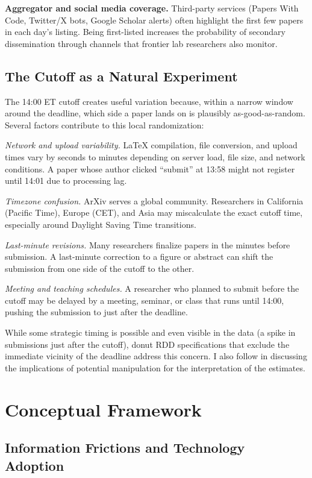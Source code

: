 \documentclass[12pt]{article}
\begin{document}
\textbf{Aggregator and social media coverage.} Third-party services (Papers With Code, Twitter/X bots, Google Scholar alerts) often highlight the first few papers in each day's listing. Being first-listed increases the probability of secondary dissemination through channels that frontier lab researchers also monitor.

\subsection{The Cutoff as a Natural Experiment}

The 14:00 ET cutoff creates useful variation because, within a narrow window around the deadline, which side a paper lands on is plausibly as-good-as-random. Several factors contribute to this local randomization:

\textit{Network and upload variability.} LaTeX compilation, file conversion, and upload times vary by seconds to minutes depending on server load, file size, and network conditions. A paper whose author clicked ``submit'' at 13:58 might not register until 14:01 due to processing lag.

\textit{Timezone confusion.} ArXiv serves a global community. Researchers in California (Pacific Time), Europe (CET), and Asia may miscalculate the exact cutoff time, especially around Daylight Saving Time transitions.

\textit{Last-minute revisions.} Many researchers finalize papers in the minutes before submission. A last-minute correction to a figure or abstract can shift the submission from one side of the cutoff to the other.

\textit{Meeting and teaching schedules.} A researcher who planned to submit before the cutoff may be delayed by a meeting, seminar, or class that runs until 14:00, pushing the submission to just after the deadline.

While some strategic timing is possible and even visible in the data (a spike in submissions just after the cutoff), donut RDD specifications that exclude the immediate vicinity of the deadline address this concern. I also follow \citet{gerard2020} in discussing the implications of potential manipulation for the interpretation of the estimates.


\section{Conceptual Framework}

\subsection{Information Frictions and Technology Adoption}
\end{document}
